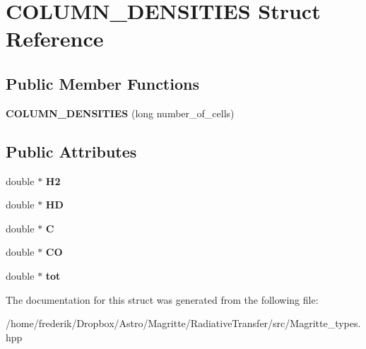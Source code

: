 \hypertarget{structCOLUMN__DENSITIES}{}\section{C\+O\+L\+U\+M\+N\+\_\+\+D\+E\+N\+S\+I\+T\+I\+ES Struct Reference}
\label{structCOLUMN__DENSITIES}
\subsection*{Public Member Functions}
\begin{DoxyCompactItemize}
\item 
\mbox{\label{structCOLUMN__DENSITIES_ae7207b1a6fffa51886a7f6bdad928360}} 
{\bfseries C\+O\+L\+U\+M\+N\+\_\+\+D\+E\+N\+S\+I\+T\+I\+ES} (long number\+\_\+of\+\_\+cells)
\end{DoxyCompactItemize}
\subsection*{Public Attributes}
\begin{DoxyCompactItemize}
\item 
\mbox{\label{structCOLUMN__DENSITIES_aa5a4661bd0403001d9899864de20cb98}} 
double $\ast$ {\bfseries H2}
\item 
\mbox{\label{structCOLUMN__DENSITIES_ae969a6a5cc46d682284df27134ea306d}} 
double $\ast$ {\bfseries HD}
\item 
\mbox{\label{structCOLUMN__DENSITIES_a2a03f29e1bd514b089f39c717500a83d}} 
double $\ast$ {\bfseries C}
\item 
\mbox{\label{structCOLUMN__DENSITIES_a9e8cd710168684b36ff467cc61dc5e8e}} 
double $\ast$ {\bfseries CO}
\item 
\mbox{\label{structCOLUMN__DENSITIES_ae8fe1d7763c3faa9de466027fbeea259}} 
double $\ast$ {\bfseries tot}
\end{DoxyCompactItemize}


The documentation for this struct was generated from the following file\+:\begin{DoxyCompactItemize}
\item 
/home/frederik/\+Dropbox/\+Astro/\+Magritte/\+Radiative\+Transfer/src/Magritte\+\_\+types.\+hpp\end{DoxyCompactItemize}
